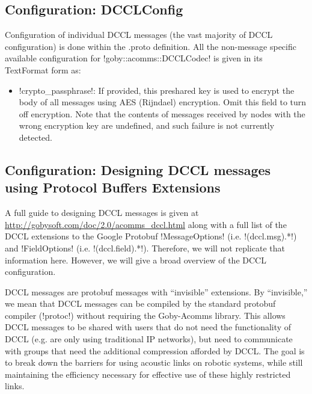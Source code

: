 \subsection{Configuration: DCCLConfig}

Configuration of individual DCCL messages (the vast majority of DCCL configuration) is done within the .proto definition. All the non-message specific available configuration for !goby::acomms::DCCLCodec! is given in its TextFormat form as:

\resetbvlinenumber

\begin{itemize}
\item !crypto_passphrase!: If provided, this preshared key is used to encrypt the body of all messages using AES (Rijndael) encryption. Omit this field to turn off encryption. Note that the contents of messages received by nodes with the wrong encryption key are undefined, and such failure is not currently detected.
\end{itemize}

\subsection{Configuration: Designing DCCL messages using Protocol Buffers Extensions}




A full guide to designing DCCL messages is given at \url{http://gobysoft.com/doc/2.0/acomms_dccl.html} along with a full list of the DCCL extensions to the Google Protobuf !MessageOptions! (i.e. !(dccl.msg).*!) and !FieldOptions! (i.e. !(dccl.field).*!). Therefore, we will not replicate that information here. However, we will give a broad overview of the DCCL configuration.

DCCL messages are protobuf messages with ``invisible'' extensions. By ``invisible,'' we mean that DCCL messages can be compiled by the standard protobuf compiler (!protoc!) without requiring the Goby-Acomms library. This allows DCCL messages to be shared with users that do not need the functionality of DCCL (e.g. are only using traditional IP networks), but need to communicate with groups that need the additional compression afforded by DCCL. The goal is to break down the barriers for using acoustic links on robotic systems, while still maintaining the efficiency necessary for effective use of these highly restricted links.

